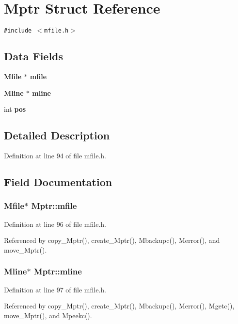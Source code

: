 \section{Mptr Struct Reference}
\label{structMptr}
{\tt \#include $<$mfile.h$>$}

\subsection*{Data Fields}
\begin{CompactItemize}
\item 
\bf{Mfile} $\ast$ \bf{mfile}
\item 
\bf{Mline} $\ast$ \bf{mline}
\item 
int \bf{pos}
\end{CompactItemize}


\subsection{Detailed Description}




Definition at line 94 of file mfile.h.

\subsection{Field Documentation}
\subsubsection{\setlength{\rightskip}{0pt plus 5cm}\bf{Mfile}$\ast$ \bf{Mptr::mfile}}\label{structMptr_c177646408c7e45893d9ce351ed56f02}




Definition at line 96 of file mfile.h.

Referenced by copy\_\-Mptr(), create\_\-Mptr(), Mbackupc(), Merror(), and move\_\-Mptr().
\subsubsection{\setlength{\rightskip}{0pt plus 5cm}\bf{Mline}$\ast$ \bf{Mptr::mline}}\label{structMptr_8c5f5862b0ae314b2b4db1c36093c2df}




Definition at line 97 of file mfile.h.

Referenced by copy\_\-Mptr(), create\_\-Mptr(), Mbackupc(), Merror(), Mgetc(), move\_\-Mptr(), and Mpeekc().
